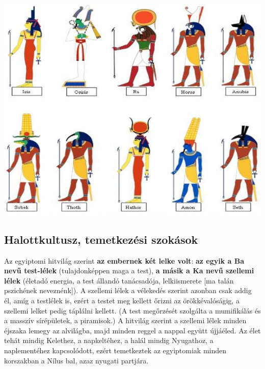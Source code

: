 \begin{tcolorbox}[enhanced,colframe=gray!50!white,
	colbacktitle=white!15!white,
	coltitle=gray!50!black,
	borderline={0.5mm}{0mm}{gray!15!white},
	borderline={0.5mm}{0mm}{gray!50!white,dashed},
	attach boxed title to top center={yshift=-2mm},
	boxed title style={boxrule=0.4pt},
	title=Az ókori Egyiptom istenei]{
		\includegraphics[width=1.0\linewidth]{images/01/istenek}}
\end{tcolorbox}

\subsection*{Halottkultusz, temetkezési szokások}

	Az egyiptomi hitvilág szerint \textbf{az embernek két lelke volt}:\textbf{ az egyik a Ba nevű test-lélek} (tulajdonképpen maga a test), \textbf{a másik a Ka nevű szellemi lélek} (életadó energia, a test állandó tanácsadója, lelkiismerete [ma talán pszichének neveznénk]). A szellemi lélek a vélekedés szerint azonban csak addig él, amíg a testlélek is, ezért a testet meg kellett őrizni az örökkévalóságig, a szellemi lelket pedig táplálni kellett. (A test megőrzését szolgálta a mumifikálás és a masszív sírépületek, a piramisok.) A hitvilág szerint a szellemi lélek minden éjszaka lemegy az alvilágba, majd minden reggel a nappal együtt újjáéled. Az élet tehát mindig Kelethez, a napkeltéhez, a halál mindig Nyugathoz, a naplementéhez kapcsolódott, ezért temetkeztek az egyiptomiak minden korszakban a Nílus bal, azaz nyugati partjára.
	
